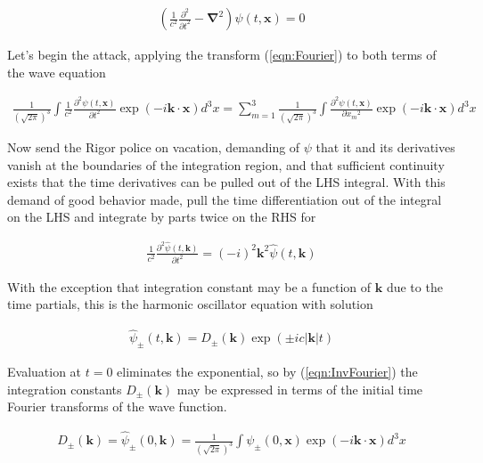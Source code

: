 \documentclass[]{eliblog}
\newcommand{\Abs}[1]{{\left\lvert{#1}\right\rvert}}
\newcommand{\Bk}[0]{\mathbf{k}}
\newcommand{\Bx}[0]{\mathbf{x}}
\newcommand{\spacegrad}[0]{\boldsymbol{\nabla}}
\newcommand{\delambertian}[0]{\square}
\newcommand{\inv}[1]{\frac{1}{#1}}
\newcommand{\kcap}[0]{\hat{\Bk}}
\begin{document}
\begin{align}\label{eqn:psiWave}
\left( \frac{1}{c^2}\frac{\partial^2}{{\partial t}^2} - \spacegrad^2 \right) \psi(t,\Bx) = 0
\end{align}

Let's begin the attack, applying the transform (\ref{eqn:Fourier}) to both terms of the wave equation

\begin{align}
\inv{(\sqrt{2\pi})^3} \int 
\inv{c^2} \frac{\partial^2 \psi(t,\Bx)}{\partial t^2}
\exp\left( -i \Bk \cdot \Bx \right) d^3 x 
=
\sum_{m=1}^3 \inv{(\sqrt{2\pi})^3} \int \frac{\partial^2 \psi(t, \Bx) }{\partial {x_m}^2} \exp\left( -i \Bk \cdot \Bx \right) d^3 x 
\end{align}

Now send the Rigor police on vacation, demanding of $\psi$ that it and its derivatives vanish at the boundaries of the integration region,
and that sufficient continuity exists that the time derivatives can be pulled out of the LHS integral.  With this demand of good 
behavior made, pull the time 
differentiation out of the integral on the LHS and integrate by parts twice on the RHS for

\begin{align}
\inv{c^2} \frac{\partial^2 \hat{\psi}(t,\Bk)}{\partial t^2} = (-i)^2 \Bk^2 \hat{\psi}(t,\Bk)
\end{align}

With the exception that integration constant may be a function of $\Bk$ due to the time partials, this is the 
harmonic oscillator equation with solution

\begin{align}\label{eqn:harmonicSolution}
\hat{\psi}_{\pm}(t,\Bk) = D_{\pm}(\Bk) \exp(\pm i c \Abs{\Bk} t)
\end{align}

Evaluation at $t=0$ eliminates the exponential, so by (\ref{eqn:InvFourier}) the 
integration constants $D_{\pm}(\Bk)$ may be expressed in terms of the initial time Fourier transforms of the wave function.

\begin{align}\label{eqn:integrationConst}
D_{\pm}(\Bk) = \hat{\psi}_{\pm}(0,\Bk) = \inv{(\sqrt{2\pi})^3} \int \psi_{\pm}(0,\Bx) \exp\left( -i \Bk \cdot \Bx \right) d^3 x 
\end{align}
\end{document}
